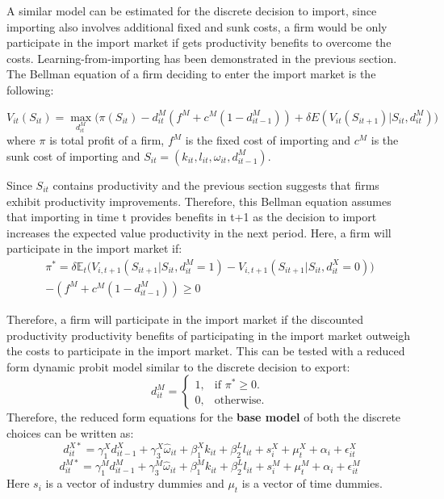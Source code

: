 \documentclass[12pt]{article}
\begin{document}
A similar model can be estimated for the discrete decision to import,
since importing also involves additional fixed and sunk costs, a firm
would be only participate in the import market if gets productivity
benefits to overcome the costs. Learning-from-importing has been
demonstrated in the previous section.  The Bellman equation of a firm
deciding to enter the import market is the following: 

\begin{equation}
V_{it}(S_{it})=  \underset{d_{it}^{M}}{\max}\Big(\pi(S_{it}) - d_{it}^{M}( f^{M} +
c^{M}(1-d_{it-1}^{M}))  + \delta E (V_{it}(S_{it+1})|S_{it}, d_{it}^{M})\Big)
\end{equation}
where $\pi$ is total profit of a firm, $f^{M}$ is the fixed cost of
importing and  $c^{M}$ is the sunk cost of importing and  $S_{it} = (k_{it}, l_{it}, \omega_{it},
d_{it-1}^{M})$. 

Since $S_{it}$ contains productivity and the previous section suggests
that firms exhibit productivity improvements. Therefore,  this Bellman equation assumes that
importing in time t provides benefits  in t+1 as the decision to
import increases the expected value productivity in the next period. Here, a firm will participate in the
import market if:
\begin{equation}
\begin{aligned}
\pi^{*}= 
\delta \mathbb{E}_{t}\Big(V_{i,t+1}(S_{it+1}|S_{it},d_{it}^{M}=1) -
V_{i,t+1}(S_{it+1}|S_{it},d_{it}^{X}=0) \Big) \\-  
(f^{M} + c^{M}(1-d_{it-1}^{M})) \geq 0
\end{aligned}
\end{equation}

Therefore, a firm will participate in the import market if the
discounted productivity productivity benefits of participating in the
import market outweigh the costs to participate in the import
market. This can be tested with a reduced form dynamic probit model similar to
the discrete decision to export: 
\begin{equation}
  d_{it}^{M}=\begin{cases}
   1 , & \text{if $\pi^{*} \geq 0 $}.\\
   0 , & \text{otherwise}.
  \end{cases}
\end{equation}
Therefore, the reduced form equations for the \textbf{base model} of both the discrete choices
can be written as:
\begin{equation}
d_{it}^{X*} = \gamma_{1}^{X} d_{it-1}^{X} + 
\gamma_{3}^{X} \hat{\omega}_{it}  + \beta_{1}^{X}k_{it}  +\beta_{2}^{L}l_{it}+
s_{i}^{X} + \mu_{t}^{X}  + \alpha_{i}+\epsilon_{it}^{X}
\end{equation}
\begin{equation}
d_{it}^{M*} = \gamma_{1}^{M} d_{it-1}^{M} + 
\gamma_{3}^{M} \hat{\omega}_{it}  + \beta_{1}^{M}k_{it}  +\beta_{2}^{L}l_{it}+
s_{i}^{M} + \mu_{t}^{M}  + \alpha_{i}+\epsilon_{it}^{M}
\end{equation}
Here $s_{i}$ is a vector of industry dummies and $\mu_{t}$ is a vector
of time dummies. 
\end{document}
